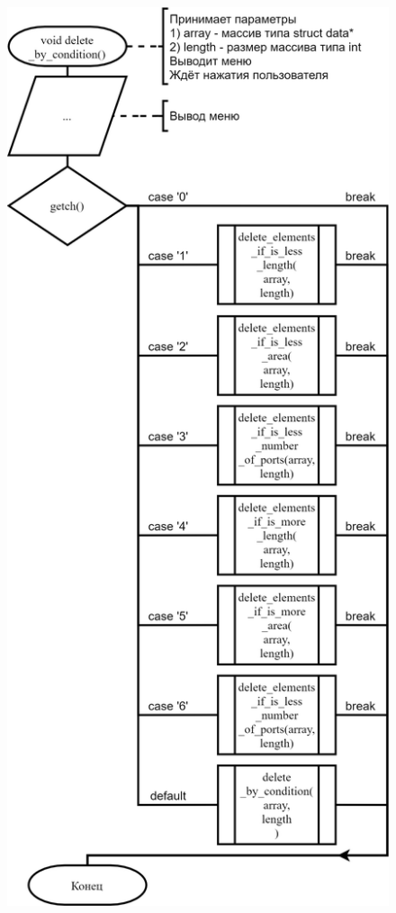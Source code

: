 \begin{figure}[!htp]
    \includegraphics{../../Makefile-project/src/submenu/delete_by_condition/delete_by_condition-1.png}
\end{figure}
